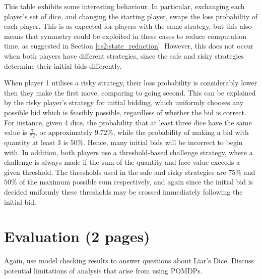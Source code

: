 This table exhibits some interesting behaviour. In particular, exchanging each player's set of dice, and changing the starting player, swaps the loss probability of each player. This is as expected for players with the same strategy, but this also means that symmetry could be exploited in these cases to reduce computation time, as suggested in Section \ref{cs2:state_reduction}. However, this does not occur when both players have different strategies, since the safe and risky strategies determine their initial bids differently.

When player 1 utilises a risky strategy, their loss probability is considerably lower then they make the first move, comparing to going second. This can be explained by the risky player's strategy for initial bidding, which uniformly chooses any possible bid which is feasibly possible, regardless of whether the bid is correct. For instance, given 4 dice, the probability that at least three dice have the same value is $\frac{7}{72}$, or approximately $9.72\%$, while the probability of making a bid with quantity at least 3 is $50\%$. Hence, many initial bids will be incorrect to begin with. In addition, both players use a threshold-based challenge strategy, where a challenge is always made if the sum of the quantity and face value exceeds a given threshold. The thresholds used in the safe and risky strategies are $75\%$ and $50\%$ of the maximum possible sum respectively, and again since the initial bid is decided uniformly these thresholds may be crossed immediately following the initial bid.



\section{Evaluation (2 pages)}

Again, use model checking results to answer questions about Liar's Dice. Discuss potential limitations of analysis that arise from using POMDPs.

